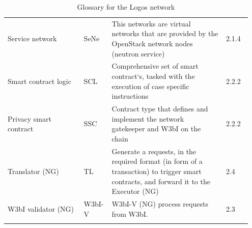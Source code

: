 \documentclass[]{article}
\begin{document}
\begin{longtable}{p{0.3\linewidth} p{0.1\linewidth} p{0.45\linewidth} p{0.1\linewidth}}
Service network & SeNe & This networks are virtual networks that are provided by the OpenStack network nodes (neutron service) & 2.1.4 \\ %
Smart contract logic & SCL & Comprehensive set of smart contract`s, tasked with the execution of case specific instructions & 2.2.2 \\ %
Privacy smart contract & SSC & Contract type that defines and implement the network gatekeeper and W3bI on the chain & 2.2.2 \\ %
Translator (NG) & TL & Generate a requests, in the required format (in form of a transaction) to trigger smart contracts, and forward it to the Executor (NG) & 2.4 \\ %
W3bI validator (NG) & W3bI-V & W3bI-V (NG) process requests from W3bI. & 2.3 \\ %

	\caption{Glossary for the Logos network}
\end{longtable}
\end{document}
